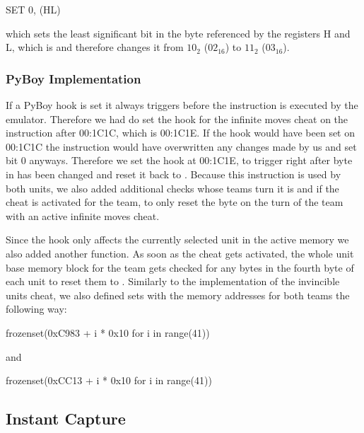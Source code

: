SET 0, (HL)

which sets the least significant bit in the byte referenced by the registers H and L, which is  and therefore changes it from $10_2$ ($02_{16}$) to $11_2$ ($03_{16}$).

\subsubsection{PyBoy Implementation}
If a PyBoy hook is set it always triggers before the instruction is executed by the emulator.
Therefore we had do set the hook for the infinite moves cheat on the instruction after 00:1C1C, which is 00:1C1E. If the hook would have been set on 00:1C1C the instruction would have overwritten any changes made by us and set bit 0 anyways.
Therefore we set the hook at 00:1C1E, to trigger right after byte in  has been changed and reset it back to .
Because this instruction is used by both units, we also added additional checks whose teams turn it is and if the cheat is activated for the team, to only reset the  byte on the turn of the team with an active infinite moves cheat. 

Since the hook only affects the currently selected unit in the active memory we also added another function.
As soon as the cheat gets activated, the whole unit base memory block for the team gets checked for any  bytes in the fourth byte of each unit to reset them to . Similarly to the implementation of the invincible units cheat, we also defined sets with the memory addresses for both teams the following way:

frozenset(0xC983 + i * 0x10 for i in range(41))

and

frozenset(0xCC13 + i * 0x10 for i in range(41))


\subsection{Instant Capture}
